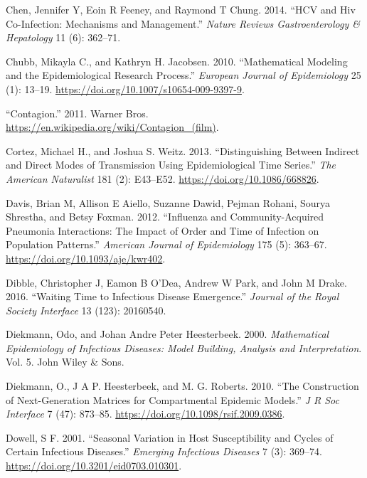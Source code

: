 \documentclass[
]{book}
\begin{document}
\leavevmode\hypertarget{ref-chen14}{}%
Chen, Jennifer Y, Eoin R Feeney, and Raymond T Chung. 2014. ``HCV and Hiv Co-Infection: Mechanisms and Management.'' \emph{Nature Reviews Gastroenterology \& Hepatology} 11 (6): 362--71.

\leavevmode\hypertarget{ref-chubb10}{}%
Chubb, Mikayla C., and Kathryn H. Jacobsen. 2010. ``Mathematical Modeling and the Epidemiological Research Process.'' \emph{European Journal of Epidemiology} 25 (1): 13--19. \url{https://doi.org/10.1007/s10654-009-9397-9}.

\leavevmode\hypertarget{ref-contagionmovie}{}%
``Contagion.'' 2011. Warner Bros. \url{https://en.wikipedia.org/wiki/Contagion_(film)}.

\leavevmode\hypertarget{ref-cortez13}{}%
Cortez, Michael H., and Joshua S. Weitz. 2013. ``Distinguishing Between Indirect and Direct Modes of Transmission Using Epidemiological Time Series.'' \emph{The American Naturalist} 181 (2): E43--E52. \url{https://doi.org/10.1086/668826}.

\leavevmode\hypertarget{ref-davis12}{}%
Davis, Brian M, Allison E Aiello, Suzanne Dawid, Pejman Rohani, Sourya Shrestha, and Betsy Foxman. 2012. ``Influenza and Community-Acquired Pneumonia Interactions: The Impact of Order and Time of Infection on Population Patterns.'' \emph{American Journal of Epidemiology} 175 (5): 363--67. \url{https://doi.org/10.1093/aje/kwr402}.

\leavevmode\hypertarget{ref-dibble16}{}%
Dibble, Christopher J, Eamon B O'Dea, Andrew W Park, and John M Drake. 2016. ``Waiting Time to Infectious Disease Emergence.'' \emph{Journal of the Royal Society Interface} 13 (123): 20160540.

\leavevmode\hypertarget{ref-diekmann00}{}%
Diekmann, Odo, and Johan Andre Peter Heesterbeek. 2000. \emph{Mathematical Epidemiology of Infectious Diseases: Model Building, Analysis and Interpretation}. Vol. 5. John Wiley \& Sons.

\leavevmode\hypertarget{ref-diekmann10}{}%
Diekmann, O., J A P. Heesterbeek, and M. G. Roberts. 2010. ``The Construction of Next-Generation Matrices for Compartmental Epidemic Models.'' \emph{J R Soc Interface} 7 (47): 873--85. \url{https://doi.org/10.1098/rsif.2009.0386}.

\leavevmode\hypertarget{ref-dowell01}{}%
Dowell, S F. 2001. ``Seasonal Variation in Host Susceptibility and Cycles of Certain Infectious Diseases.'' \emph{Emerging Infectious Diseases} 7 (3): 369--74. \url{https://doi.org/10.3201/eid0703.010301}.
\end{document}
